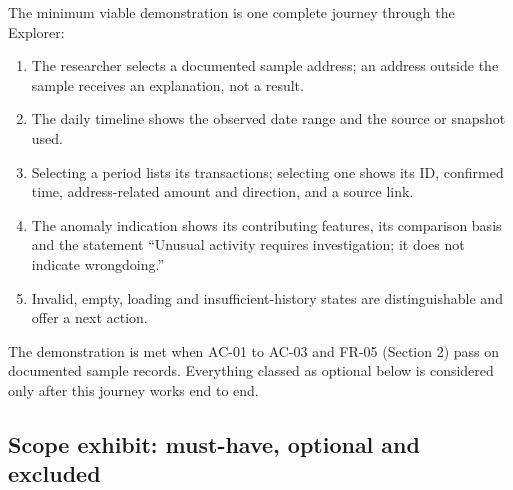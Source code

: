 The minimum viable demonstration is one complete journey through the Explorer:

\begin{enumerate}
  \item The researcher selects a documented sample address; an address outside the sample receives an explanation, not a result.
  \item The daily timeline shows the observed date range and the source or snapshot used.
  \item Selecting a period lists its transactions; selecting one shows its ID, confirmed time, address-related amount and direction, and a source link.
  \item The anomaly indication shows its contributing features, its comparison basis and the statement “Unusual activity requires investigation; it does not indicate wrongdoing.”
  \item Invalid, empty, loading and insufficient-history states are distinguishable and offer a next action.
\end{enumerate}

The demonstration is met when AC-01 to AC-03 and FR-05 (Section 2) pass on documented sample records. Everything classed as optional below is considered only after this journey works end to end.

\subsection{Scope exhibit: must-have, optional and excluded}
\label{sec:exhibit}

